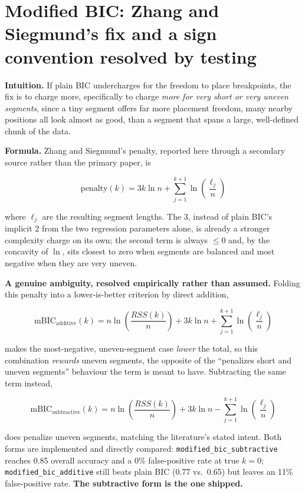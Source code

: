 \documentclass[11pt]{article}
\newcommand{\code}[1]{\texttt{#1}}
\begin{document}
\section{Modified BIC: Zhang and Siegmund's fix and a sign convention resolved by testing}

\textbf{Intuition.} If plain BIC undercharges for the freedom to place
breakpoints, the fix is to charge more, specifically to charge \emph{more
for very short or very uneven segments}, since a tiny segment offers far
more placement freedom, many nearby positions all look almost as good, than
a segment that spans a large, well-defined chunk of the data.

\textbf{Formula.} Zhang and Siegmund's penalty, reported here through a
secondary source rather than the primary paper, is

\begin{equation}
\text{penalty}(k) = 3k \ln n + \sum_{j=1}^{k+1} \ln\!\left(\frac{\ell_j}{n}\right)
\end{equation}

where $\ell_j$ are the resulting segment lengths. The $3$, instead of plain
BIC's implicit $2$ from the two regression parameters alone, is already a
stronger complexity charge on its own; the second term is always $\le 0$
and, by the concavity of $\ln$, sits closest to zero when segments are
balanced and most negative when they are very uneven.

\textbf{A genuine ambiguity, resolved empirically rather than assumed.}
Folding this penalty into a lower-is-better criterion by direct addition,

\begin{equation}
\mathrm{mBIC}_{\text{additive}}(k) = n \ln\!\left(\frac{RSS(k)}{n}\right) + 3k \ln n + \sum_{j=1}^{k+1} \ln\!\left(\frac{\ell_j}{n}\right)
\end{equation}

makes the most-negative, uneven-segment case \emph{lower} the total, so this
combination \emph{rewards} uneven segments, the opposite of the
``penalizes short and uneven segments'' behaviour the term is meant to
have. Subtracting the same term instead,

\begin{equation}
\mathrm{mBIC}_{\text{subtractive}}(k) = n \ln\!\left(\frac{RSS(k)}{n}\right) + 3k \ln n - \sum_{j=1}^{k+1} \ln\!\left(\frac{\ell_j}{n}\right)
\end{equation}

does penalize uneven segments, matching the literature's stated intent.
Both forms are implemented and directly compared:
\code{modified\_bic\_subtractive} reaches 0.85 overall accuracy and a 0\%
false-positive rate at $\text{true } k = 0$; \code{modified\_bic\_additive}
still beats plain BIC (0.77 vs.\ 0.65) but leaves an 11\% false-positive
rate. \textbf{The subtractive form is the one shipped.}
\end{document}
